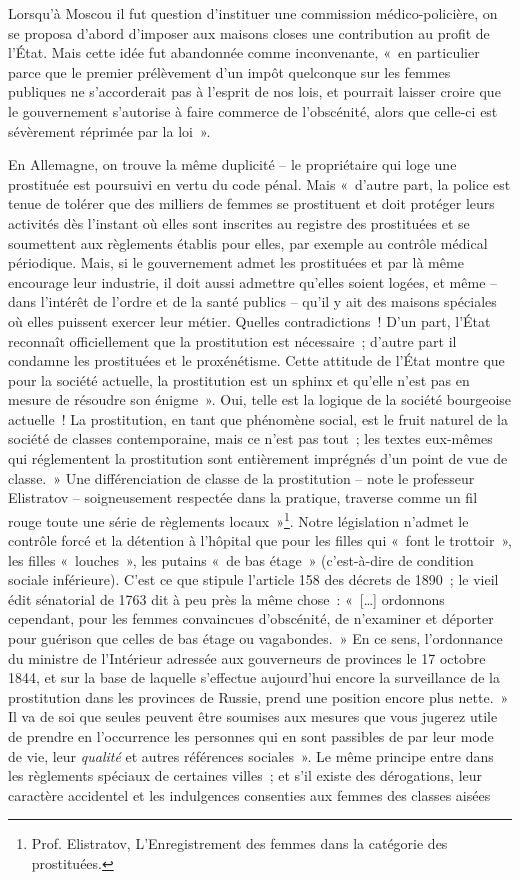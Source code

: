 \documentclass[french,twoside]{book} %
\begin{document}
Lorsqu’à Moscou il fut question d’instituer une commission médico-policière, on se proposa d’abord d’imposer aux maisons closes une contribution au profit de l’État. Mais cette idée fut abandonnée comme inconvenante, « en particulier parce que le premier prélèvement d’un impôt quelconque sur les femmes publiques ne s’accorderait pas à l’esprit de nos lois, et pourrait laisser croire que le gouvernement s’autorise à faire commerce de l’obscénité, alors que celle-ci est sévèrement réprimée par la loi ».\par
En Allemagne, on trouve la même duplicité – le propriétaire qui loge une prostituée est poursuivi en vertu du code pénal. Mais « d’autre part, la police est tenue de tolérer que des milliers de femmes se prostituent et doit protéger leurs activités dès l’instant où elles sont inscrites au registre des prostituées et se soumettent aux règlements établis pour elles, par exemple au contrôle médical périodique. Mais, si le gouvernement admet les prostituées et par là même encourage leur industrie, il doit aussi admettre qu’elles soient logées, et même – dans l’intérêt de l’ordre et de la santé publics – qu’il y ait des maisons spéciales où elles puissent exercer leur métier. Quelles contradictions ! D’un part, l’État reconnaît officiellement que la prostitution est nécessaire ; d’autre part il condamne les prostituées et le proxénétisme. Cette attitude de l’État montre que pour la société actuelle, la prostitution est un sphinx et qu’elle n’est pas en mesure de résoudre son énigme ». Oui, telle est la logique de la société bourgeoise actuelle ! La prostitution, en tant que phénomène social, est le fruit naturel de la société de classes contemporaine, mais ce n’est pas tout ; les textes eux-mêmes qui réglementent la prostitution sont entièrement imprégnés d’un point de vue de classe. » Une différenciation de classe de la prostitution – note le professeur Elistratov – soigneusement respectée dans la pratique, traverse comme un fil rouge toute une série de règlements locaux »\footnote{Prof. Elistratov, L’Enregistrement des femmes dans la catégorie des prostituées.}. Notre législation n’admet le contrôle forcé et la détention à l’hôpital que pour les filles qui « font le trottoir », les filles « louches », les putains « de bas étage » (c’est-à-dire de condition sociale inférieure). C’est ce que stipule l’article 158 des décrets de 1890 ; le vieil édit sénatorial de 1763 dit à peu près la même chose : « […] ordonnons cependant, pour les femmes convaincues d’obscénité, de n’examiner et déporter pour guérison que celles de bas étage ou vagabondes. » En ce sens, l’ordonnance du ministre de l’Intérieur adressée aux gouverneurs de provinces le 17 octobre 1844, et sur la base de laquelle s’effectue aujourd’hui encore la surveillance de la prostitution dans les provinces de Russie, prend une position encore plus nette. » Il va de soi que seules peuvent être soumises aux mesures que vous jugerez utile de prendre en l’occurrence les personnes qui en sont passibles de par leur mode de vie, leur \emph{qualité} et autres références sociales ». Le même principe entre dans les règlements spéciaux de certaines villes ; et s’il existe des dérogations, leur caractère accidentel et les indulgences consenties aux femmes des classes aisées 
\end{document}
